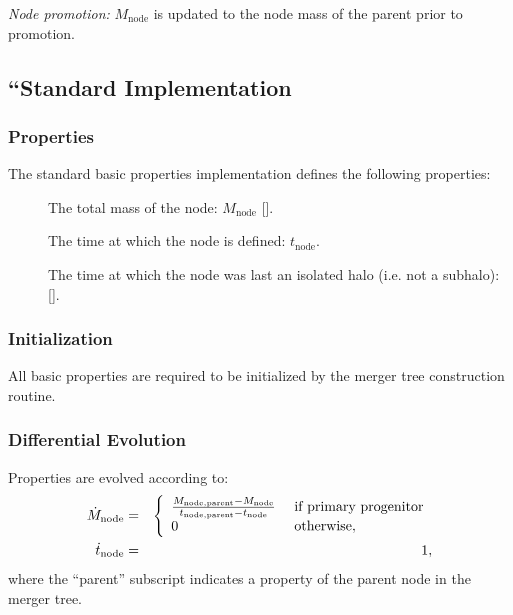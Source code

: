 \noindent\emph{Node promotion:} $M_\mathrm{node}$ is updated to the \gls{node} mass of the parent prior to promotion.\\

\subsection{``Standard Implementation}

\subsubsection{Properties}

The standard basic properties implementation defines the following properties:
\begin{description}
 \item [] The total mass of the node: $M_\mathrm{node}$ [].
 \item [] The time at which the \gls{node} is defined: $t_\mathrm{node}$.
 \item [] The time at which the \gls{node} was last an isolated halo (i.e. not a subhalo): [].
\end{description}

\subsubsection{Initialization}

All basic properties are required to be initialized by the merger tree construction routine.

\subsubsection{Differential Evolution}

Properties are evolved according to:
\begin{eqnarray}
 \dot{M}_\mathrm{node} &=& \left\{\begin{array}{ll}{M_\mathrm{node, parent} - M_\mathrm{node} \over t_\mathrm{node, parent} - t_\mathrm{node}} & \hbox{ if primary progenitor} \\ 0 & \hbox{ otherwise}, \end{array} \right. \\
 \dot{t}_\mathrm{node} &=& 1,
\end{eqnarray}
where the ``parent'' subscript indicates a property of the parent \gls{node} in the merger tree.

